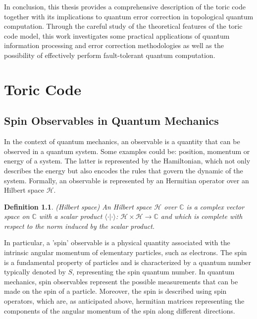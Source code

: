 \documentclass{Configuration_Files/PoliMi3i_thesis}
\newtheorem{definition}{Definition}[chapter]
\begin{document}
In conclusion, this thesis provides a comprehensive description of the 
toric code together with its implications to quantum error correction in topological 
quantum computation. 
Through the careful study of the theoretical features of the toric code model, this work  investigates some
practical applications of quantum information processing and error 
correction methodologies as well as the possibility of effectively perform fault-tolerant 
quantum computation. \newline
















\chapter{Toric Code}
\label{ch:chapter_one}%


\section{Spin Observables in Quantum Mechanics}
\label{sec:Observables}

In the context of quantum mechanics, an observable is a quantity that can be observed in a quantum system. Some examples could be: position, momentum or energy of a system. The latter is represented by the Hamiltonian, which not only describes the energy but also encodes the rules that govern the dynamic of the system. 
Formally, an observable is represented by an Hermitian operator over an Hilbert space $\mathscr{H}$.

\begin{definition} (Hilbert space)
	An Hilbert space $\mathscr{H}$ over $\mathbb{C}$ is a complex vector space on $\mathbb{C}$  
	with a scalar product $\langle \cdot \vert \cdot \rangle $: $\mathscr{H} \times \mathscr{H} \rightarrow \mathbb{C}$ and which is complete with respect to the norm induced by the scalar product.
\end{definition}

In particular, a 'spin' observable is a physical quantity associated with the intrinsic angular momentum of elementary particles, such as electrons. The spin is a fundamental property of particles and is characterized by a quantum number typically denoted by $S$, representing the spin quantum number.
In quantum mechanics, spin observables represent the possible measurements that can be made on the spin of a particle. Moreover, the spin is described using spin operators, which are, as anticipated above, hermitian matrices representing the components of the angular momentum of the spin along different directions. 
\end{document}
